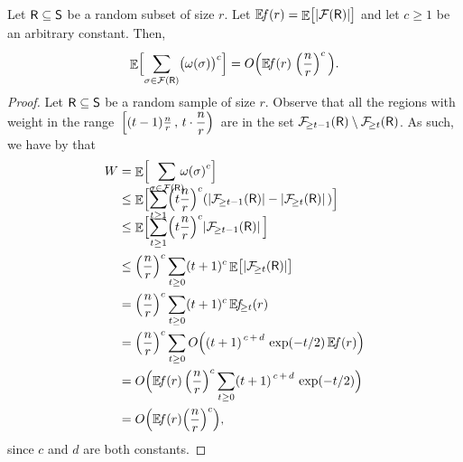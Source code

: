 \begin{theorem}
    Let $\mathsf{R} \subseteq \mathsf{S}$ be a random subset of size
    $r$. Let
    $\NumOfRegionsZero{r} = \Ex{\bigl. |\RegionsSet{\Sample}| }$ and
    let $c \geq 1$ be an arbitrary constant. Then,
    \begin{equation*}
        \biggl.
        \Ex{\Bigl. \smash{ \sum_{\Trap \in \RegionsSet{\Sample}}
              \pth{\bigl.\WeightX{\Trap}}^c}}%
        =%
        O \pth{
           \NumOfRegionsZero{r} \; \pth{\frac{n}{r}}^c\,}.
    \end{equation*}    
\end{theorem}
\smallskip%
\begin{proof}
    Let $\mathsf{R} \subseteq \mathsf{S}$ be a random sample  of size $r$. Observe that all the regions with weight
    in the range $\displaystyle\, \left[(t-1)\tfrac{n}{r} \,, \, t\cdot
        \frac{n}{r} \right)\,$ are in the set
    $\RegionsHeavy{t-1}{\Sample} \setminus \RegionsHeavy{t}{\Sample}
    $. As such, we have by  that
    \begin{align*}
      W
      &=%
        \Ex{\Bigl.\smash{\sum_{\Trap \in \RegionsSet{\Sample}}\!\!\! \WeightX{\Trap}^c }}%
      \\&%
        \leq%
        \Ex{\Bigl. \smash{ \sum_{t \ge 1} \pth{ t \frac{n}{r} }^c \pth{
        \cardin{\RegionsHeavy{t-1}{\Sample}} -
        \cardin{\RegionsHeavy{t}{\Sample} }\, } }}%
      \\&%
        \leq%
        \Ex{\Bigl. \smash{ \sum_{t \ge 1} \pth{ t \frac{n}{r} }^c {\MakeSBig
        \cardin{\RegionsHeavy{t-1}{\Sample}} }\, }}
      \\[2ex]
      &
        \leq%
        \pth{\frac{n}{r} }^{c} \sum_{t \ge 0} (t+1)^c 
        \Ex{\bigl. \cardin{\RegionsHeavy{t}{\Sample} } }
      \\&%
        =%
        \pth{ \frac{n}{r} }^c \sum_{t \ge 0} (t+1)^c \,
        \NumOfRegions{t}{r}%
      \\&%
        =%
        \pth{ \frac{n}{r} }^c \sum_{t \ge 0}
        O\pth{ \pth{t+1}^{\,c \, + \,d} \, \exp(-t/2) \,
        \NumOfRegionsZero{ r } }
      \\&
      =%
      O\Bigl( \NumOfRegionsZero{r } \, \pth{ \frac{n}{r} }^c
      \sum_{t \ge 0} \pth{t+1}^{\,c\,+\,d} \, \exp(-t/2)
      \Bigr)%
      \\&=%
      O \pth{ \NumOfRegionsZero{r } 
      \pth{{\frac{n}{r}} }^c },
    \end{align*}
    since $c$ and $d$ are both constants.
\end{proof}

